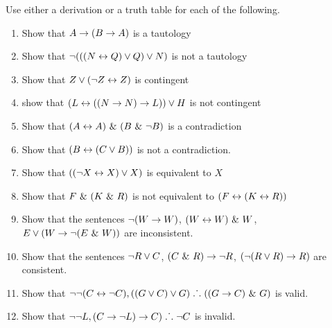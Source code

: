 \noindent\problempart Use either a derivation or a truth table for each of the following. 
\begin{enumerate}%
\item Show that $A \rightarrow (B \rightarrow A)$ is a tautology
\item Show that ${\neg} (((N \leftrightarrow Q) \vee Q) \vee N)$ is not a tautology
\item Show that $ Z \vee ({\neg} Z \leftrightarrow Z) $ is contingent
\item show that $ (L \leftrightarrow ((N \rightarrow N) \rightarrow L)) \vee H $ is not contingent
\item Show that $ (A \leftrightarrow A) ~\&~ (B ~\&~ {\neg} B)$ is a contradiction
\item Show that $ (B \leftrightarrow (C \vee B)) $ is not a contradiction.
\item Show that $ (({\neg} X \leftrightarrow X) \vee X) $ is equivalent to $X$
\item Show that $F ~\&~ (K ~\&~ R) $ is not equivalent to $ (F \leftrightarrow (K \leftrightarrow R)) $
\item Show that the sentences $ {\neg} (W \rightarrow W)$, $(W \leftrightarrow W) ~\&~ W$, $E \vee (W \rightarrow {\neg} (E ~\&~ W))$ are inconsistent.
\item Show that the sentences  ${\neg} R \vee C $, $(C ~\&~ R) \rightarrow {\neg} R$, $({\neg} (R \vee R) \rightarrow R) $ are consistent.
\item Show that ${\neg} {\neg} (C \leftrightarrow {\neg} C), ((G \vee C) \vee G) \mathrel{\ldotp\dot{}\,\ldotp} ((G \rightarrow C) ~\&~ G) $ is valid.
\item Show that $ {\neg} {\neg} L,  (C \rightarrow {\neg} L) \rightarrow C) \mathrel{\ldotp\dot{}\,\ldotp} {\neg} C$ is invalid. 
\end{enumerate}
